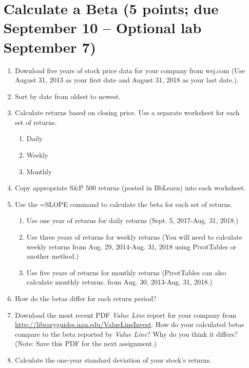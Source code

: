 \section{Calculate a Beta (5 points; due September 10 -- Optional lab September 7)}
\begin{enumerate}
\item Download five years of stock price data for your company from wsj.com (Use August 31, 2013 as your first date and August 31, 2018 as your last date.).
\item Sort by date from oldest to newest.
\item Calculate returns based on closing price. Use a separate worksheet for each set of returns.
\begin{enumerate}
\item Daily
\item Weekly
\item Monthly
\end{enumerate}
\item Copy appropriate S\&P 500 returns (posted in BbLearn) into each worksheet.
\item Use the =SLOPE command to calculate the beta for each set of returns.
\begin{enumerate}
\item Use one year of returns for daily returns (Sept. 5, 2017-Aug. 31, 2018.)
\item Use three years of returns for weekly returns (You will need to calculate weekly returns from Aug. 29, 2014-Aug. 31, 2018 using PivotTables or another method.)
\item Use five years of returns for monthly returns (PivotTables can also calculate monthly returns. from Aug. 30, 2013-Aug. 31, 2018.)
\end{enumerate}
\item How do the betas differ for each return period?
\item Download the most recent PDF \textit{Value Line} report for your company from \url{http://libraryguides.nau.edu/ValueLineInvest}. How do your calculated betas compare to the beta reported by \textit{Value Line}? Why do you think it differs? (Note: Save this PDF for the next assignment.)
\item Calculate the one-year standard deviation of your stock's returns.
\end{enumerate}
